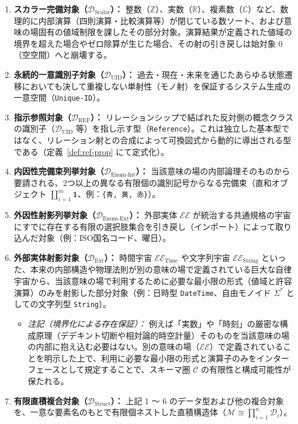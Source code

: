 \documentclass[11pt,a4paper]{ltjsarticle}
\theoremstyle{definition}
\theoremstyle{plain}
\theoremstyle{remark}
\newcommand{\Dscalar}{\mathcal{D}_{\mathrm{Scalar}}}
\newcommand{\Duid}{\mathcal{D}_{\mathrm{UID}}}
\newcommand{\Dref}{\mathcal{D}_{\mathrm{REF}}}
\newcommand{\Denumint}{\mathcal{D}_{\mathrm{Enum\text{-}Int}}}
\newcommand{\Denumext}{\mathcal{D}_{\mathrm{Enum\text{-}Ext}}}
\newcommand{\Dext}{\mathcal{D}_{\mathrm{Ext}}}
\newcommand{\Dstruct}{\mathcal{D}_{\mathrm{Struct}}}
\begin{document}
\begin{enumerate}
    \item \textbf{スカラー完備対象（$\Dscalar$）：} 整数（$\mathbb{Z}$）、実数（$\mathbb{R}$）、複素数（$\mathbb{C}$）など、数理的に内部演算（四則演算・比較演算等）が閉じている数ソート、および意味の場固有の値域制限を課したその部分対象。演算結果が定義された値域の境界を超えた場合やゼロ除算が生じた場合、その射の引き戻しは始対象 $0$（空空間）へと崩壊する。
    \item \textbf{永続的一意識別子対象（$\Duid$）：} 過去・現在・未来を通じたあらゆる状態遷移においても決して重複しない単射性（モノ射）を保証するシステム生成の一意空間（\texttt{Unique-ID}）。
    \item \textbf{指示参照対象（$\Dref$）：} リレーションシップで結ばれた反対側の概念クラスの識別子（$\Duid$ 等）を指し示す型（\texttt{Reference}）。これは独立した基本型ではなく、リレーション射との合成によって可換図式から動的に導出される型である（定義~\ref{def:ref-prop} にて定式化）。
    \item \textbf{内因性完備束列挙対象（$\Denumint$）：} 当該意味の場の内部論理そのものから要請される、2つ以上の異なる有限個の識別記号からなる完備束（直和オブジェクト $\coprod_{i=1}^m \mathbf{1}$、例：\texttt{\{青, 黄, 赤\}}）。
    \item \textbf{外因性射影列挙対象（$\Denumext$）：} 外部実体 $\mathcal{EE}$ が統治する共通規格の宇宙にすでに存在する有限の選択肢集合を引き戻し（インポート）によって取り込んだ対象（例：ISO国名コード、曜日）。
    \item \textbf{外部実体射影対象（$\Dext$）：} 時間宇宙 $\mathcal{EE}_{\mathrm{Time}}$ や文字列宇宙 $\mathcal{EE}_{\mathrm{String}}$ といった、本来の内部構造や物理法則が別の意味の場で定義されている巨大な自律宇宙から、当該意味の場で利用するために必要な最小限の形式（値域と許容演算）のみを射影した部分対象（例：日時型 \texttt{DateTime}、自由モノイド $\Sigma^*$ としての文字列型 \texttt{String}）。
    \begin{itemize}
        \item \emph{注記（境界化による存在保証）：} 例えば「実数」や「時刻」の厳密な構成原理（デデキント切断や相対論的時空計量）そのものを当該意味の場の内部に抱え込む必要はない。別の意味の場（$\mathcal{EE}$）で定義されていることを明示した上で、利用に必要な最小限の形式と演算子のみをインターフェースとして規定することで、スキーマ圏 $\mathcal{C}$ の有限性と構成可能性が保たれる。
    \end{itemize}
    \item \textbf{有限直積複合対象（$\Dstruct$）：} 上記 1 〜 6 のデータ型および他の複合対象を、一意な要素名のもとで有限個ネストした直積構造体（$\mathcal{M} \cong \prod_{i=1}^n \mathcal{D}_i$）。
\end{enumerate}
\end{document}
